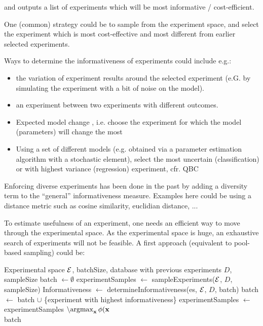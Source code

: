 \documentclass{article}
\begin{document}
and outputs a list of experiments which will be most informative / cost-efficient.

One (common) strategy could be to sample from the experiment space, and select the experiment which is most cost-effective and most different from earlier selected experiments.

Ways to determine the informativeness of experiments could include e.g.:
\begin{itemize}
\item the variation of experiment results around the selected experiment (e.G. by simulating the experiment with a bit of noise on the model).
\item an experiment between two experiments with different outcomes.
\item Expected model change \cite{cai2013maximizing}, i.e. choose the experiment for which the model (parameters) will change the most
\item Using a set of different models (e.g. obtained via a parameter estimation algorithm with a stochastic element), select the most uncertain (classification) or with highest variance (regression) experiment, cfr. QBC
\end{itemize}
Enforcing diverse experiments has been done in the past \cite{xu2007incorporating} by adding a diversity term to the ``general'' informativeness measure. Examples here could be using a distance metric such as cosine similarity, euclidian distance, ...
 
To estimate usefulness of an experiment, one needs an efficient way to 
move through the experimental space. As the experimental space is huge, an exhaustive search of experiments will not be feasible. A first approach (equivalent to pool-based sampling) could be:

\setlength{\textfloatsep}{10pt}%

\begin{algorithmic}
\Require Experimental space $\mathcal{E}$, batchSize, database with previous experiments $D$, sampleSize
\State batch $\leftarrow \emptyset$
\State experimentSamples $\leftarrow$ sampleExperiments($\mathcal{E}$, $D$, sampleSize)
     \State Informativeness $\leftarrow$ determineInformativeness(es, $\mathcal{E}$, $D$, batch)
   \EndFor
   \State batch $\leftarrow$ batch $\cup$ \{experiment with highest informativeness\}
   \State experimentSamples $\leftarrow$ experimentSamples $\setminus { \argmax_{\mathbf{x}} \phi(\mathbf{x} } $
   \EndWhile \\
   \Return batch
\EndFunction	
\end{algorithmic}
\end{document}
